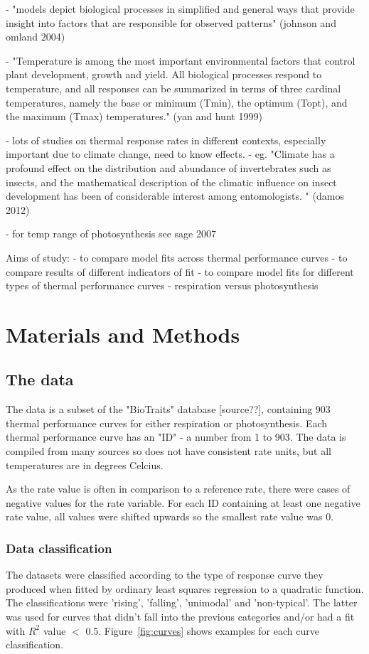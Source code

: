 \documentclass[11pt]{article}
\begin{document}
	- "models depict biological processes in simplified and general ways that provide insight into factors that are responsible for observed patterns" (johnson and omland 2004)
	
	- "Temperature is among the most important environmental factors that control plant development, growth and yield. All biological processes respond to temperature, and all responses can be summarized in terms of three cardinal temperatures, namely the base or minimum (Tmin), the optimum (Topt), and the maximum (Tmax) temperatures." (yan and hunt 1999)
	
	- lots of studies on thermal response rates in different contexts, especially important due to climate change, need to know effects.
	- eg. "Climate has a profound effect on the distribution and abundance of invertebrates such as insects, and the mathematical description of the climatic influence on insect development has been of considerable interest among entomologists. " (damos 2012)
	
	- for temp range of photosynthesis see sage 2007
	
	Aims of study:
	- to compare model fits across thermal performance curves
	- to compare results of different indicators of fit
	- to compare model fits for different types of thermal performance curves - respiration versus photosynthesis
	
\section{Materials and Methods}
	
	\subsection{The data}
	The data is a subset of the "BioTraits" database [source??], containing 903 thermal performance curves for either respiration or photosynthesis. Each thermal performance curve has an "ID" - a number from 1 to 903. The data is compiled from many sources so does not have consistent rate units, but all temperatures are in degrees Celcius.
	
	As the rate value is often in comparison to a reference rate, there were cases of negative values for the rate variable. For each ID containing at least one negative rate value, all values were shifted upwards so the smallest rate value was 0.
	
	\subsubsection*{Data classification}
	The datasets were classified according to the type of response curve they produced when fitted by ordinary least squares regression to a quadratic function. The classifications were 'rising', 'falling', 'unimodal' and 'non-typical'. The latter was used for curves that didn't fall into the previous categories and/or had a fit with $R^2$ value $<$ 0.5. Figure~\ref{fig:curves} shows examples for each curve classification.
	
\end{document}
